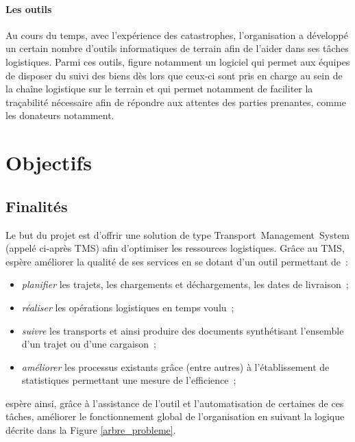 \paragraph{Les outils}
Au cours du temps, avec l'expérience des catastrophes, l'organisation a développé un certain nombre d'outils informatiques de terrain afin de l'aider dans ses tâches logistiques. Parmi ces outils, figure notamment un logiciel qui permet aux équipes de disposer du suivi des biens dès lors que ceux-ci sont pris en charge au sein de la chaîne logistique sur le terrain et qui permet notamment de faciliter la traçabilité nécessaire afin de répondre aux attentes des parties prenantes, comme les donateurs notamment.




\section{Objectifs}


\subsection{Finalités}
Le but du projet est d'offrir une solution de type Transport~Management~System (appelé ci-après TMS) afin d'optimiser les ressources logistiques. Grâce au TMS, \mo espère améliorer la qualité de ses services en se dotant d'un outil permettant de~:
\begin{itemize}
	\item \emph{planifier} les trajets, les chargements et déchargements, les dates de livraison~;
	\item \emph{réaliser} les opérations logistiques en temps voulu~;
	\item \emph{suivre} les transports et ainsi produire des documents synthétisant l'ensemble d'un trajet ou d'une cargaison~;
	\item \emph{améliorer} les processus existants grâce (entre autres) à l'établissement de statistiques permettant une mesure de l'efficience~;
\end{itemize}
\mo espère ainsi, grâce à l'assistance de l'outil et l'automatisation de certaines de ces tâches, améliorer le fonctionnement global de l'organisation en suivant la logique décrite dans la Figure \ref{arbre_probleme}.

